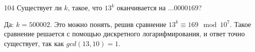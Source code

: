 \begin{task}{104}
Существует ли $k$, такое, что $13^k$ оканчивается на $\dots0000169$?
\end{task}

\begin{solution}
Да: $k = 500002$. Это можно понять, решив сравнение $13^k \equiv 169 \mod{10^7}$. Такое сравнение решается с помощью дискретного логарифмирования, и ответ точно существует, так как $gcd(13, 10) = 1$.
\end{solution}